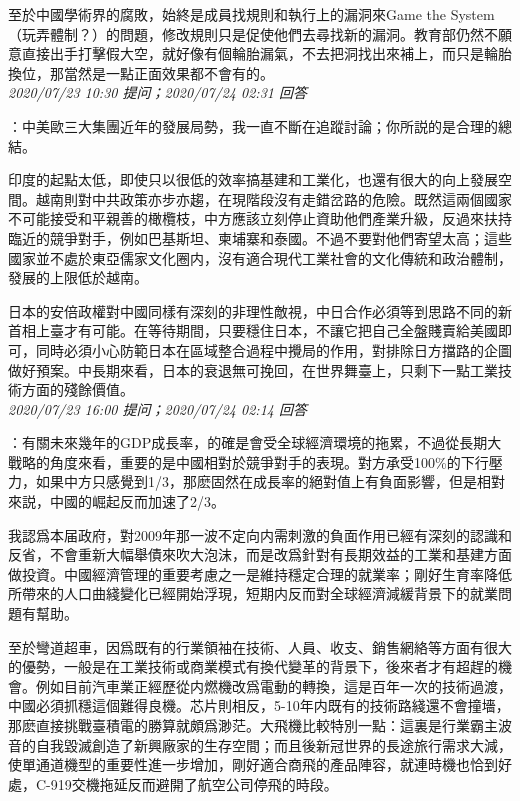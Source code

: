 \documentclass[twocolumn]{ctexart}
\begin{document}
至於中國學術界的腐敗，始終是成員找規則和執行上的漏洞來Game the System（玩弄體制？）的問題，修改規則只是促使他們去尋找新的漏洞。教育部仍然不願意直接出手打擊假大空，就好像有個輪胎漏氣，不去把洞找出來補上，而只是輪胎換位，那當然是一點正面效果都不會有的。
\\

\textit{\hfill\noindent\small 2020/07/23 10:30 提问；2020/07/24 02:31 回答}

：中美歐三大集團近年的發展局勢，我一直不斷在追蹤討論；你所説的是合理的總結。

印度的起點太低，即使只以很低的效率搞基建和工業化，也還有很大的向上發展空間。越南則對中共政策亦步亦趨，在現階段沒有走錯岔路的危險。既然這兩個國家不可能接受和平親善的橄欖枝，中方應該立刻停止資助他們產業升級，反過來扶持臨近的競爭對手，例如巴基斯坦、柬埔寨和泰國。不過不要對他們寄望太高；這些國家並不處於東亞儒家文化圈内，沒有適合現代工業社會的文化傳統和政治體制，發展的上限低於越南。

日本的安倍政權對中國同樣有深刻的非理性敵視，中日合作必須等到思路不同的新首相上臺才有可能。在等待期間，只要穩住日本，不讓它把自己全盤賤賣給美國即可，同時必須小心防範日本在區域整合過程中攪局的作用，對排除日方擋路的企圖做好預案。中長期來看，日本的衰退無可挽回，在世界舞臺上，只剩下一點工業技術方面的殘餘價值。
\\

\textit{\hfill\noindent\small 2020/07/23 16:00 提问；2020/07/24 02:14 回答}

：有關未來幾年的GDP成長率，的確是會受全球經濟環境的拖累，不過從長期大戰略的角度來看，重要的是中國相對於競爭對手的表現。對方承受100\%的下行壓力，如果中方只感覺到1/3，那麽固然在成長率的絕對值上有負面影響，但是相對來説，中國的崛起反而加速了2/3。

我認爲本届政府，對2009年那一波不定向内需刺激的負面作用已經有深刻的認識和反省，不會重新大幅舉債來吹大泡沫，而是改爲針對有長期效益的工業和基建方面做投資。中國經濟管理的重要考慮之一是維持穩定合理的就業率；剛好生育率降低所帶來的人口曲綫變化已經開始浮現，短期内反而對全球經濟減緩背景下的就業問題有幫助。

至於彎道超車，因爲既有的行業領袖在技術、人員、收支、銷售網絡等方面有很大的優勢，一般是在工業技術或商業模式有換代變革的背景下，後來者才有超趕的機會。例如目前汽車業正經歷從内燃機改爲電動的轉換，這是百年一次的技術過渡，中國必須抓穩這個難得良機。芯片則相反，5-10年内既有的技術路綫還不會撞墻，那麽直接挑戰臺積電的勝算就頗爲渺茫。大飛機比較特別一點：這裏是行業霸主波音的自我毀滅創造了新興廠家的生存空間；而且後新冠世界的長途旅行需求大減，使單通道機型的重要性進一步增加，剛好適合商飛的產品陣容，就連時機也恰到好處，C-919交機拖延反而避開了航空公司停飛的時段。
\end{document}
